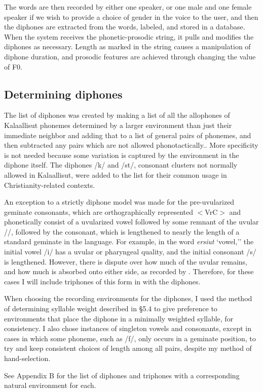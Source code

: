 \documentclass[12pt]{article}
\begin{document}
The words are then recorded by either one speaker, or one male and one female speaker if we wish to provide a choice of gender in the voice to the user, and then the diphones are extracted from the words, labeled, and stored in a database. When the system receives the phonetic-prosodic string, it pulls and modifies the diphones as necessary. Length as marked in the string causes a manipulation of diphone duration, and prosodic features are achieved through changing the value of F0.\par

	\subsection{Determining diphones}

	The list of diphones was created by making a list of all the allophones of Kalaallisut phonemes determined by a larger environment than just their immediate neighbor and adding that to a list of general pairs of phonemes, and then subtracted any pairs which are not allowed phonotactically.. More specificity is not needed because some variation is captured by the environment in the diphone itself. The diphones /k\textinvscr/ and /st/, consonant clusters not normally allowed in Kalaallisut, were added to the list for their common usage in Christianity-related contexts.\par
	An exception to a strictly diphone model was made for the pre-uvularized geminate consonants, which are orthographically represented $<$VrC$>$ and phonetically consist of a uvularized vowel followed by some remnant of the uvular /\textinvscr/, followed by the consonant, which is lengthened to nearly the length of a standard geminate in the language. For example, in the word \textit{ersiut} `vowel,'' the initial vowel /i/ has a uvular or pharyngeal quality, and the initial consonant /s/ is lengthened. However, there is dispute over how much of the uvular remains, and how much is absorbed onto either side, as recorded by \citet{rischel}. Therefore, for these cases I will include triphones of this form in with the diphones. \par
	When choosing the recording environments for the diphones, I used the method of determining syllable weight described in \S 5.4 to give preference to environments that place the diphone in a minimally weighted syllable, for consistency. I also chose instances of singleton vowels and consonants, except in cases in which some phoneme, such as /f/, only occurs in a geminate position, to try and keep consistent choices of length among all pairs, despite my method of hand-selection. \par
	See Appendix B for the list of diphones and triphones with a corresponding natural environment for each. \par
\end{document}

